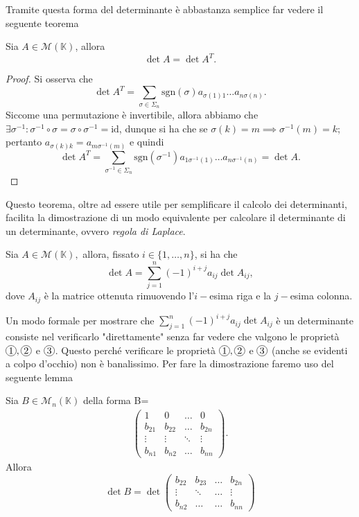 Tramite questa forma del determinante è abbastanza semplice far vedere il seguente teorema
\begin{theorem} \label{thm:det_trasp}
    Sia $A \in \mathcal{M}(\mathbb{K})$, allora
    $$
        \det{A} = \det{A^T}.
    $$
\end{theorem}
\begin{proof}
    Si osserva che
    $$
        \det{A^T} = \sum_{\sigma \in \Sigma_n} \text{sgn}(\sigma) a_{\sigma(1)1} \ldots a_{n \sigma(n)}. 
    $$
    Siccome una permutazione è invertibile, allora abbiamo che $\exists \sigma^{-1}: \sigma^{-1} \circ \sigma = \sigma \circ \sigma^{-1} = \text{id}$, dunque si ha che se $\sigma(k) = m \implies \sigma^{-1}(m) = k$; pertanto $a_{\sigma(k) k} = a_{m \sigma^{-1}(m)}$ e quindi
    $$
        \det{A^T} = \sum_{\sigma^{-1} \in \Sigma_n} \text{sgn}(\sigma^{-1}) a_{1 \sigma^{-1}(1)} \ldots a_{n \sigma^{-1}(n)} = \det{A}.
    $$
\end{proof}
Questo teorema, oltre ad essere utile per semplificare il calcolo dei determinanti, facilita la dimostrazione di un modo equivalente per calcolare il determinante di un determinante, ovvero \emph{regola di Laplace}.
\begin{theorem} \label{thm:laplace_rule}
    Sia $A \in \mathcal{M}(\mathbb{K}),$ allora, fissato $i \in \{ 1, \ldots, n \}$, si ha che
    $$
        \det{A} = \sum_{j=1}^n (-1)^{i+j} a_{ij} \det{A_{ij}},
    $$
    dove $A_{ij}$ è la matrice ottenuta rimuovendo l'$i-$esima riga e la $j-$esima colonna.
\end{theorem}
Un modo formale per mostrare che $\sum\limits_{j=1}^n (-1)^{i+j} a_{ij} \det{A_{ij}}$ è un determinante consiste nel verificarlo "direttamente" senza far vedere che valgono le proprietà $\circled{1}, \circled{2}$ e $\circled{3}$. Questo perché verificare le proprietà $\circled{1}, \circled{2}$ e $\circled{3}$ (anche se evidenti a colpo d'occhio) non è banalissimo.
Per fare la dimostrazione faremo uso del seguente lemma
\begin{lemma}
    Sia $B \in \mathcal{M}_n(\mathbb{K})$ della forma
    B=\begin{align}
        \begin{pmatrix}
            1 & 0 & \ldots & 0 \\
            b_{21} & b_{22} & \ldots & b_{2n} \\
            \vdots & \vdots & \ddots & \vdots \\
            b_{n1} & b_{n2} & \ldots & b_{nn}
        \end{pmatrix}.
    \end{align}
    Allora
    $$
        \det{B} = \det{\begin{pmatrix} b_{22} & b_{23} & \ldots & b_{2n} \\ \vdots & \ddots & \ldots & \vdots \\ b_{n2} & \ldots & \ldots & b_{nn} \end{pmatrix}}
    $$
\end{lemma}
